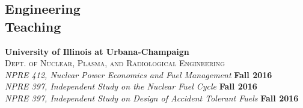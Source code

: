 \documentclass[margin,line]{resume}
\begin{document}
\begin{resume}
    \section{\mysidestyle Engineering\\Teaching}
    \textbf{University of Illinois at Urbana-Champaign}\\
    \textsc{Dept. of Nuclear, Plasma, and Radiological Engineering}\\ 
               \textsl{NPRE 412, Nuclear Power Economics and Fuel Management} 
               \hfill \textbf{Fall 2016}\\
               \textsl{NPRE 397, Independent Study on the Nuclear Fuel Cycle} 
               \hfill \textbf{Fall 2016}\\
               \textsl{NPRE 397, Independent Study on Design of Accident Tolerant Fuels} 
               \hfill \textbf{Fall 2016}\\
               \vspace{2mm}\\



\end{resume}
\end{document}
